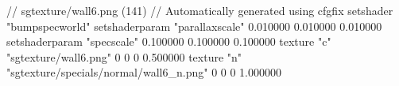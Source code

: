 // sgtexture/wall6.png (141)
// Automatically generated using cfgfix
setshader "bumpspecworld"
setshaderparam "parallaxscale" 0.010000 0.010000 0.010000
setshaderparam "specscale" 0.100000 0.100000 0.100000
texture "c" "sgtexture/wall6.png" 0 0 0 0.500000
texture "n" "sgtexture/specials/normal/wall6_n.png" 0 0 0 1.000000
